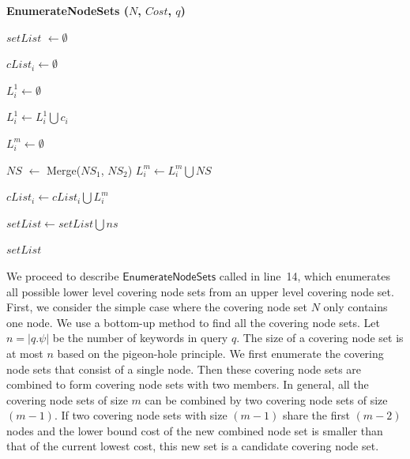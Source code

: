 \documentclass{sig-alternate}
\begin{document}
\begin{algorithm}[!ht]\small\label{alg:enumNS}
\caption{ \bf {EnumerateNodeSets} ($N$, $Cost$, $q$)}



$setList$ $\leftarrow \emptyset$\;


 {
    $cList_i \leftarrow \emptyset$\;

    $L_i^1 \leftarrow \emptyset$\;

    {
        {
            $L_i^1 \leftarrow L_i^1 \bigcup c_i$\;
        }
    }

    {
        $L_i^m \leftarrow \emptyset$\;

        {
            {
                {
                    $NS$ $\leftarrow$ Merge($NS_1$, $NS_2$)\;
                    {$L_i^m \leftarrow L_i^m \bigcup NS$\;}
                }
            }
        }

        $cList_i \leftarrow cList_i \bigcup L_i^m$\;
    }
}

 {
    {
       $setList \leftarrow setList \bigcup ns$\;
    }
}

\Return $setList$\;\vspace{-1ex}

\end{algorithm}

We proceed to describe $\mathsf{EnumerateNodeSets}$ called in line~14, which
enumerates all possible lower level covering node sets from an upper
level covering node set.
%
First, we consider the simple case where the covering node set $N$
only contains one node. We use a bottom-up method to find all the
covering node sets.
%
Let $n = |q.\psi|$ be the number of keywords in query $q$. The size
of a covering node set is at most $n$ based on the pigeon-hole
principle.
%
We first enumerate the covering node sets  that consist of a single
node. Then these covering node sets are combined to form covering
node sets with two members. In general, all the covering node sets
of size $m$ can be combined by two covering node sets of size
$(m-1)$. If two covering node sets with size $(m-1)$ share the first
$(m-2)$ nodes and the lower bound cost of the new combined node set
is smaller than that of the current lowest cost, this new set is a candidate
covering node set.
\end{document}
